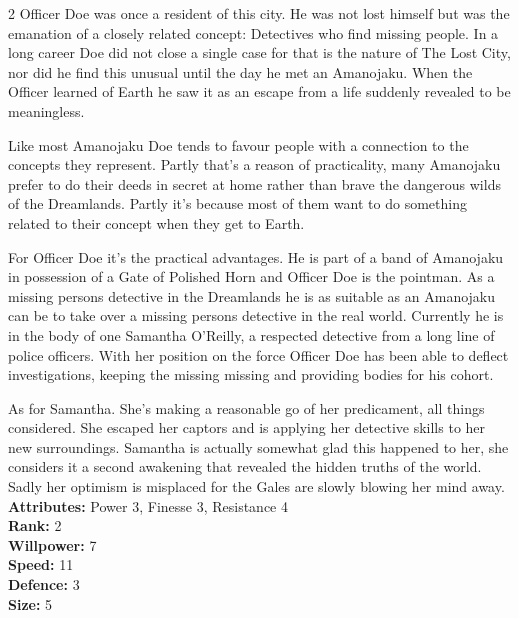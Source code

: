 \begin{multicols}{2}
Officer Doe was once a resident of this city. He was not lost himself but was the emanation of a closely related concept: Detectives who find missing people. In a long career Doe did not close a single case for that is the nature of The Lost City, nor did he find this unusual until the day he met an Amanojaku. When the Officer learned of Earth he saw it as an escape from a life suddenly revealed to be meaningless.

Like most Amanojaku Doe tends to favour people with a connection to the concepts they represent. Partly that's a reason of practicality, many Amanojaku prefer to do their deeds in secret at home rather than brave the dangerous wilds of the Dreamlands. Partly it's because most of them want to do something related to their concept when they get to Earth.

For Officer Doe it's the practical advantages. He is part of a band of Amanojaku in possession of a Gate of Polished Horn and Officer Doe is the pointman. As a missing persons detective in the Dreamlands he is as suitable as an Amanojaku can be to take over a missing persons detective in the real world. Currently he is in the body of one Samantha O'Reilly, a respected detective from a long line of police officers. With her position on the force Officer Doe has been able to deflect investigations, keeping the missing missing and providing bodies for his cohort. 

As for Samantha. She's making a reasonable go of her predicament, all things considered. She escaped her captors and is applying her detective skills to her new surroundings. Samantha is actually somewhat glad this happened to her, she considers it a second awakening that revealed the hidden truths of the world. Sadly her optimism is misplaced for the Gales are slowly blowing her mind away. \\

\noindent \textbf{Attributes:} Power 3, Finesse 3, Resistance 4\\

\noindent \textbf{Rank:} 2\\

\noindent \textbf{Willpower:} 7\\

\noindent \textbf{Speed:} 11\\

\noindent \textbf{Defence:} 3\\

\noindent \textbf{Size:} 5 \\


\end{multicols}

